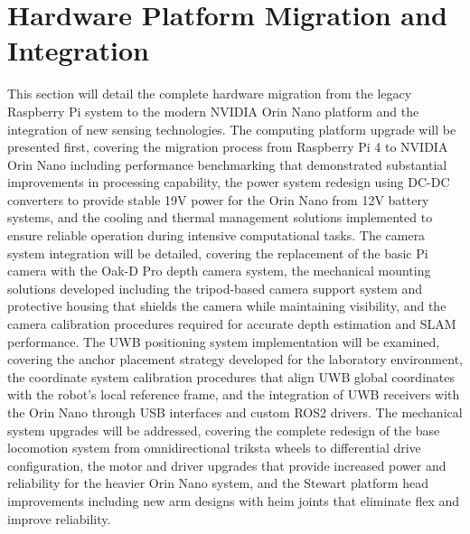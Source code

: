 \section{Hardware Platform Migration and Integration}
This section will detail the complete hardware migration from the legacy Raspberry Pi system to the modern NVIDIA Orin Nano platform and the integration of new sensing technologies. The computing platform upgrade will be presented first, covering the migration process from Raspberry Pi 4 to NVIDIA Orin Nano including performance benchmarking that demonstrated substantial improvements in processing capability, the power system redesign using DC-DC converters to provide stable 19V power for the Orin Nano from 12V battery systems, and the cooling and thermal management solutions implemented to ensure reliable operation during intensive computational tasks. The camera system integration will be detailed, covering the replacement of the basic Pi camera with the Oak-D Pro depth camera system, the mechanical mounting solutions developed including the tripod-based camera support system and protective housing that shields the camera while maintaining visibility, and the camera calibration procedures required for accurate depth estimation and SLAM performance. The UWB positioning system implementation will be examined, covering the anchor placement strategy developed for the laboratory environment, the coordinate system calibration procedures that align UWB global coordinates with the robot's local reference frame, and the integration of UWB receivers with the Orin Nano through USB interfaces and custom ROS2 drivers. The mechanical system upgrades will be addressed, covering the complete redesign of the base locomotion system from omnidirectional triksta wheels to differential drive configuration, the motor and driver upgrades that provide increased power and reliability for the heavier Orin Nano system, and the Stewart platform head improvements including new arm designs with heim joints that eliminate flex and improve reliability.

